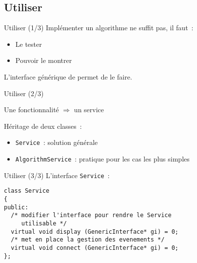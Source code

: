 \subsection{Utiliser }
\begin{frame}{Utiliser  (1/3)}
  Implémenter un algorithme ne suffit pas, il faut~:

  \begin{itemize}
  	\item Le tester
	\item Pouvoir le montrer
  \end{itemize}

  L'interface générique de  permet de le faire.
\end{frame}

\begin{frame}{Utiliser  (2/3)}

  \begin{center}
    Une fonctionnalité $\Rightarrow$ un service
  \end{center}

  Héritage de deux classes~: 

  \begin{itemize}
    \item \texttt{Service}~: solution générale
    \item \texttt{AlgorithmService}~: pratique pour les cas les plus simples
  \end{itemize}
\end{frame}

\begin{frame}[containsverbatim]{Utiliser  (3/3)}
L'interface \texttt{Service}~:

\begin{verbatim}
class Service
{
public:
  /* modifier l'interface pour rendre le Service
     utilisable */
  virtual void display (GenericInterface* gi) = 0;
  /* met en place la gestion des evenements */
  virtual void connect (GenericInterface* gi) = 0;
};
\end{verbatim}

\end{frame}


